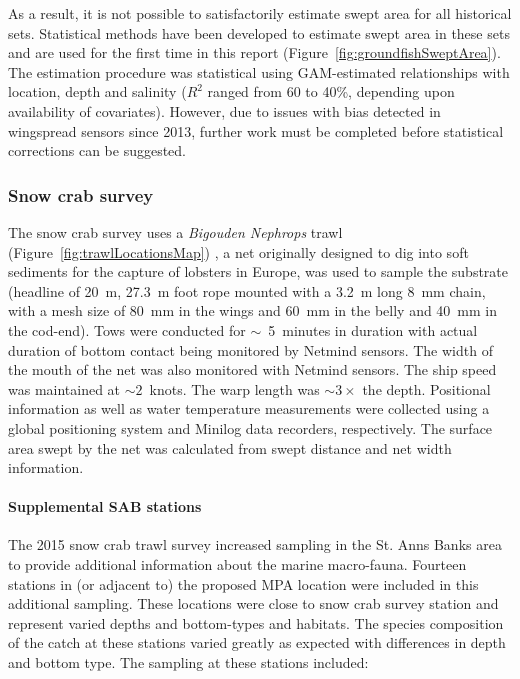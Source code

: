 \documentclass[letterpaper,portrait,11pt]{scrartcl}
\numberwithin{equation}{section}		%
\numberwithin{figure}{section}		%
\numberwithin{table}{section}				%
\begin{document}
As a result, it is not possible to satisfactorily estimate swept area for all historical sets. Statistical methods have been developed to estimate swept area in these sets and are used for the first time in this report (Figure~\ref{fig:groundfishSweptArea}). The estimation procedure was statistical using GAM-estimated relationships with location, depth and salinity ($R^2$ ranged from 60 to 40\%, depending upon availability of covariates). However, due to issues with bias detected in wingspread sensors since 2013, further work must be completed before statistical corrections can be suggested.





\clearpage
\subsubsection{Snow crab survey}
\label{(se:snowcrab)}

The snow crab survey uses a \textit{Bigouden Nephrops} trawl (Figure~\ref{fig:trawlLocationsMap}) , a net originally designed to dig into soft sediments for the capture of lobsters in Europe,  was used to sample the substrate (headline of 20~m, 27.3~m foot rope mounted with a 3.2~m long 8~mm chain, with a mesh size of 80~mm in the wings and 60~mm in the belly and 40~mm in the cod-end). Tows were conducted for $\sim$~5~minutes in duration with actual duration of bottom contact being monitored by Netmind sensors. The width of the mouth of the net was also monitored with Netmind sensors. The ship speed was maintained at $\sim 2$~knots. The warp length was $\sim 3 \times$ the depth. Positional information as well as water temperature measurements were collected using a global positioning system and Minilog data recorders, respectively. The surface area swept by the net was calculated from swept distance and net width information.

\paragraph{Supplemental SAB stations}

The 2015 snow crab trawl survey increased sampling in the St. Anns Banks area to provide additional information about the marine macro-fauna. Fourteen stations in (or adjacent to) the proposed MPA location were included in this additional sampling. These locations were close to snow crab survey station and represent varied depths and bottom-types and habitats. The species composition of the catch at these stations varied greatly as expected with differences in depth and bottom type. The sampling at these stations included:
\end{document}
